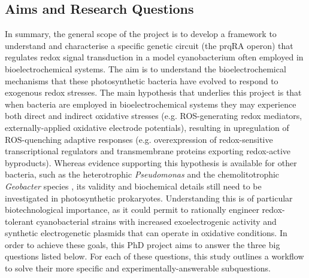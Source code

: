 \subsection{Aims and Research Questions}
In summary, the general scope of the project is to develop a framework to understand and characterise a specific genetic circuit (the prqRA operon) that regulates redox signal transduction in a model cyanobacterium often employed in bioelectrochemical systems. 
The aim is to understand the bioelectrochemical mechanisms that these photosynthetic bacteria have evolved to respond to exogenous redox stresses.
The main hypothesis that underlies this project is that when bacteria are employed in bioelectrochemical systems they may experience both direct and indirect oxidative stresses (e.g. ROS-generating redox mediators, externally-applied oxidative electrode potentials), resulting in upregulation of ROS-quenching adaptive responses (e.g. overexpression of redox-sensitive transcriptional regulators and transmembrane proteins exporting redox-active byproducts). 
Whereas evidence supporting this hypothesis is available for other bacteria, such as the heterotrophic \textit{Pseudomonas} \citep{Nikel2021} and the chemolitotrophic \textit{Geobacter} species \citep{Levar2017}, its validity and biochemical details still need to be investigated in photosynthetic prokaryotes. 
Understanding this is of particular biotechnological importance, as it could permit to rationally engineer redox-tolerant cyanobacterial strains with increased exoelectrogenic activity and synthetic electrogenetic plasmids that can operate in oxidative conditions.
In order to achieve these goals, this PhD project aims to answer the three big questions listed below. For each of these questions, this study outlines a workflow to solve their more specific and experimentally-answerable subquestions.   

